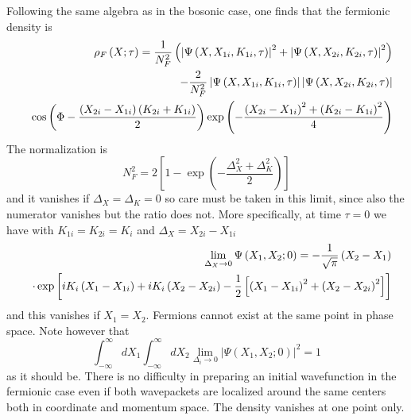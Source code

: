 \documentclass[preprint,aps]{revtex4}
\begin{document}
Following the same algebra as in the bosonic case, one finds that the
fermionic density is
\begin{eqnarray}
&&\rho _{F}\left( X;\tau \right) =\frac{1}{N_{F}^{2}}\left( \left\vert \Psi
\left( X,X_{1i},K_{1i},\tau \right) \right\vert ^{2}+\left\vert \Psi \left(
X,X_{2i},K_{2i},\tau \right) \right\vert ^{2}\right)  \notag \\
&&-\frac{2}{N_{F}^{2}}\left\vert \Psi \left( X,X_{1i},K_{1i},\tau \right)
\right\vert \left\vert \Psi \left( X,X_{2i},K_{2i},\tau \right) \right\vert
\notag \\
&&\cos \left( \Phi -\frac{\left( X_{2i}-X_{1i}\right) \left(
K_{2i}+K_{1i}\right) }{2}\right) \exp \left( -\frac{\left(
X_{2i}-X_{1i}\right) ^{2}+\left( K_{2i}-K_{1i}\right) ^{2}}{4}\right)
\label{2.24}
\end{eqnarray}%
The normalization is
\begin{equation}
N_{F}^{2}=2\left[ 1-\exp \left( -\frac{\Delta _{X}^{2}+\Delta _{K}^{2}}{2}%
\right) \right]   \label{2.25}
\end{equation}%
and it vanishes if $\Delta _{X}=\Delta _{K}=0$ so care must be taken in this
limit, since also the numerator vanishes but the ratio does not. More
specifically, at time $\tau =0$ we have with $K_{1i}=K_{2i}=K_{i}$ and $%
\Delta _{X}=X_{2i}-X_{1i}$
\begin{eqnarray}
&&\lim_{\Delta _{X}\rightarrow 0}\Psi \left( X_{1},X_{2};0\right) =-\frac{1}{%
\sqrt{\pi }}\left( X_{2}-X_{1}\right)  \notag \\
&&\cdot \exp \left[ iK_{i}\left( X_{1}-X_{1i}\right) +iK_{i}\left(
X_{2}-X_{2i}\right) -\frac{1}{2}\left[ \left( X_{1}-X_{1i}\right)
^{2}+\left( X_{2}-X_{2i}\right) ^{2}\right] \right]  \label{2.26}
\end{eqnarray}%
and this vanishes if $X_{1}=X_{2}$. Fermions cannot exist at the same point
in phase space. Note however that
\begin{equation}
\int_{-\infty }^{\infty }dX_{1}\int_{-\infty }^{\infty }dX_{2}\lim_{\Delta
_{i}\rightarrow 0}\left\vert \Psi \left( X_{1},X_{2};0\right) \right\vert
^{2}=1  \label{2.27}
\end{equation}%
as it should be. There is no difficulty in preparing an initial wavefunction
in the fermionic case even if both wavepackets are localized around the same
centers both in coordinate and momentum space. The density vanishes at one
point only.
\end{document}
